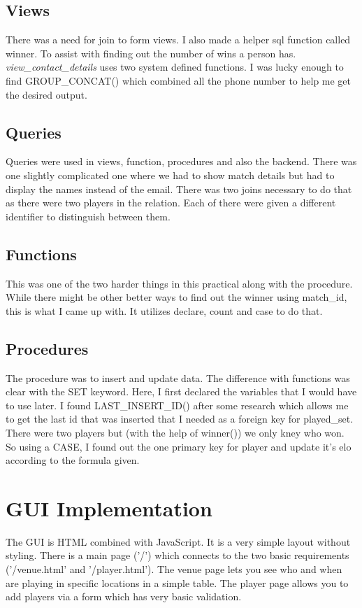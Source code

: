 \documentclass[11pt]{article}
\begin{document}
\subsection{Views}
\label{sec:org539458b}
There was a need for join to form views. I also made a helper sql function called winner. To assist with finding out the number of wins a person has. \emph{view\_contact\_details} uses two system defined functions. I was lucky enough to find GROUP\_CONCAT() which combined all the phone number to help me get the desired output.
\subsection{Queries}
\label{sec:orgc1a25bb}
Queries were used in views, function, procedures and also the backend. There was one slightly complicated one where we had to show match details but had to display the names instead of the email. There was two joins necessary to do that as there were two players in the relation. Each of there were given a different identifier to distinguish between them.
\subsection{Functions}
\label{sec:orgfcc5a21}
This was one of the two harder things in this practical along with the procedure. While there might be other better ways to find out the winner using match\_id, this is what I came up with. It utilizes declare, count and case to do that.
\subsection{Procedures}
\label{sec:org7c8f1d6}
The procedure was to insert and update data. The difference with functions was clear with the SET keyword. Here, I first declared the variables that I would have to use later. I found LAST\_INSERT\_ID() after some research which allows me to get the last id that was inserted that I needed as a foreign key for played\_set. There were two players but (with the help of winner()) we only kney who won. So using a CASE, I found out the one primary key for player and update it's elo according to the formula given.
\section{GUI Implementation}
\label{sec:org543f576}
The GUI is HTML combined with JavaScript. It is a very simple layout without styling. There is a main page ('/') which connects to the two basic requirements ('/venue.html' and '/player.html'). The venue page lets you see who and when are playing in specific locations in a simple table. The player page allows you to add players via a form which has very basic validation.
\end{document}
